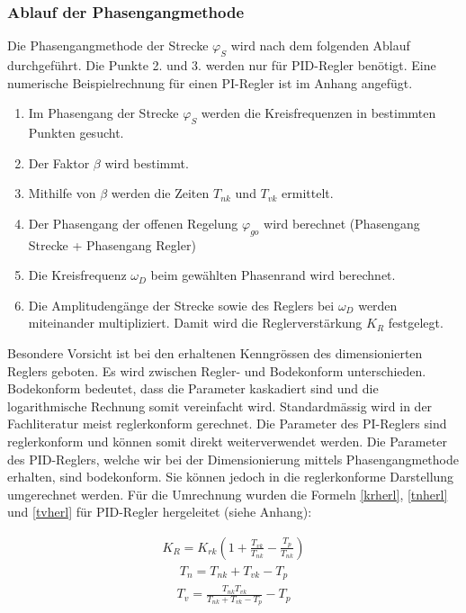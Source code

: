 \newpage
\subsubsection{Ablauf der Phasengangmethode}
Die Phasengangmethode der Strecke $\varphi_S$ wird nach dem folgenden Ablauf durchgeführt. Die Punkte 2. und 3. werden nur für PID-Regler benötigt. Eine numerische Beispielrechnung für einen PI-Regler ist im Anhang angefügt.
\begin{enumerate}
\item Im Phasengang der Strecke $\varphi_S$ werden die Kreisfrequenzen in bestimmten Punkten gesucht.
\item Der Faktor $\beta$ wird bestimmt.
\item Mithilfe von $\beta$ werden die Zeiten $T_{nk}$ und $T_{vk}$ ermittelt.
\item Der Phasengang der offenen Regelung $\varphi_{go}$ wird berechnet (Phasengang Strecke + Phasengang Regler)
\item Die Kreisfrequenz $\omega_D$ beim gewählten Phasenrand wird berechnet.
\item Die Amplitudengänge der Strecke sowie des Reglers bei $\omega_D$ werden miteinander multipliziert. Damit wird die Reglerverstärkung $K_R$ festgelegt. 
\end{enumerate}

Besondere Vorsicht ist bei den erhaltenen Kenngrössen des dimensionierten Reglers geboten. Es wird zwischen Regler- und Bodekonform unterschieden. Bodekonform bedeutet, dass die Parameter kaskadiert sind und die logarithmische Rechnung somit vereinfacht wird. Standardmässig wird in der Fachliteratur meist reglerkonform gerechnet. Die Parameter des PI-Reglers sind reglerkonform und können somit direkt weiterverwendet werden. Die Parameter des PID-Reglers, welche wir bei der Dimensionierung mittels Phasengangmethode erhalten, sind bodekonform. Sie können jedoch in die reglerkonforme Darstellung umgerechnet werden. Für die Umrechnung wurden die Formeln \ref{krherl}, \ref{tnherl} und \ref{tvherl} für PID-Regler hergeleitet (siehe Anhang): \cite{zellwegerpha}\newline

\begin{align}
K_R=K_{rk}\left(1+\frac{T_{vk}}{T_{nk}}-\frac{T_p}{T_{nk}}\right)
\label{krherl}
\end{align}
\begin{align}
T_n=T_{nk}+T_{vk}-T_p
\label{tnherl}
\end{align}
\begin{align}
T_v=\frac{T_{nk}T_{vk}}{T_{nk}+T_{vk}-T_p}-T_p
\label{tvherl}
\end{align}\newline

